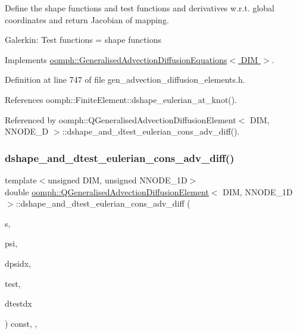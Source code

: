 Define the shape functions and test functions and derivatives w.\+r.\+t. global coordinates and return Jacobian of mapping.

Galerkin\+: Test functions = shape functions 

Implements \hyperlink{classoomph_1_1GeneralisedAdvectionDiffusionEquations_a0e891c570cc7fa21f6b489bc5b2b77c0}{oomph\+::\+Generalised\+Advection\+Diffusion\+Equations$<$ D\+I\+M $>$}.



Definition at line 747 of file gen\+\_\+advection\+\_\+diffusion\+\_\+elements.\+h.



References oomph\+::\+Finite\+Element\+::dshape\+\_\+eulerian\+\_\+at\+\_\+knot().



Referenced by oomph\+::\+Q\+Generalised\+Advection\+Diffusion\+Element$<$ D\+I\+M, N\+N\+O\+D\+E\+\_\+D $>$\+::dshape\+\_\+and\+\_\+dtest\+\_\+eulerian\+\_\+cons\+\_\+adv\+\_\+diff().

\mbox{\label{classoomph_1_1QGeneralisedAdvectionDiffusionElement_ac3743f95fd8a381bb86b2a1fd08673f4}} 
\subsubsection{\texorpdfstring{dshape\+\_\+and\+\_\+dtest\+\_\+eulerian\+\_\+cons\+\_\+adv\+\_\+diff()}{dshape\_and\_dtest\_eulerian\_cons\_adv\_diff()}}
{\footnotesize\ttfamily template$<$unsigned D\+IM, unsigned N\+N\+O\+D\+E\+\_\+1D$>$ \\
double \hyperlink{classoomph_1_1QGeneralisedAdvectionDiffusionElement}{oomph\+::\+Q\+Generalised\+Advection\+Diffusion\+Element}$<$ D\+IM, N\+N\+O\+D\+E\+\_\+1D $>$\+::dshape\+\_\+and\+\_\+dtest\+\_\+eulerian\+\_\+cons\+\_\+adv\+\_\+diff (\begin{DoxyParamCaption}\item[{const \hyperlink{classoomph_1_1Vector}{Vector}$<$ double $>$ \&}]{s,  }\item[{\hyperlink{classoomph_1_1Shape}{Shape} \&}]{psi,  }\item[{\hyperlink{classoomph_1_1DShape}{D\+Shape} \&}]{dpsidx,  }\item[{\hyperlink{classoomph_1_1Shape}{Shape} \&}]{test,  }\item[{\hyperlink{classoomph_1_1DShape}{D\+Shape} \&}]{dtestdx }\end{DoxyParamCaption}) const\hspace{0.3cm}{\ttfamily [inline]}, {\ttfamily [protected]}, {\ttfamily [virtual]}}



